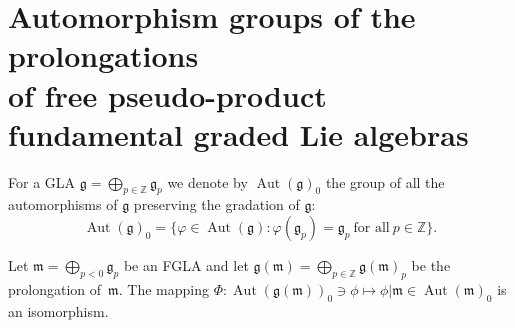 \documentclass[pdftex]{sigma}
\numberwithin{equation}{section}
\numberwithin{theorem}{section}
\numberwithin{proposition}{section}
\numberwithin{lemma}{section}
\numberwithin{corollary}{section}
\numberwithin{definition}{section}
\numberwithin{example}{section}
\numberwithin{remark}{section}
\numberwithin{note}{section}
\newcommand{\Aut}{\operatorname{Aut}}
\newcommand{\gla}[1]{\mathfrak#1=\bigoplus\limits_{p\in\mathbb Z}\mathfrak#1_p} \renewcommand{\labelenumi}{{\rm (\arabic{enumi})}}
\begin{document}
\section{Automorphism groups of the prolongations\\ of free pseudo-product
fundamental graded Lie algebras}\label{section9}

For a GLA $\gla g$
we denote by $\Aut(\mathfrak g)_0$ the group of all the automorphisms of
$\mathfrak g$ preserving the gradation of $\mathfrak g$:
\[
\Aut(\mathfrak g)_0=\{\varphi\in\Aut(\mathfrak g):\varphi(\mathfrak g_p)=
\mathfrak g_p \ \text{for all}\ p\in\mathbb Z\}.
\]

\begin{proposition}\label{prop9.1} Let $\mathfrak m=\bigoplus\limits_{p<0}\mathfrak g_p$ be
an FGLA and let $\mathfrak g(\mathfrak m)
=\bigoplus\limits_{p\in\mathbb Z}\mathfrak g(\mathfrak m)_p$
be the prolongation of~$\mathfrak m$.
The mapping
$\Phi:\Aut(\mathfrak g(\mathfrak m))_0\ni\phi\mapsto
\phi|\mathfrak m\in\Aut(\mathfrak m)_0$ is an isomorphism.
\end{proposition}
\end{document}
